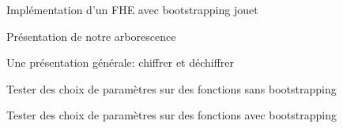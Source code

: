 \begin{section}{Implémentation d'un FHE avec bootstrapping \og{} jouet\fg{}}
	\begin{subsection}{Présentation de notre arborescence}
	\end{subsection}
	\begin{subsection}{Une présentation générale: chiffrer et déchiffrer}
	\end{subsection}
	\begin{subsection}{Tester des choix de paramètres sur des fonctions sans bootstrapping}
	\end{subsection}
	\begin{subsection}{Tester des choix de paramètres sur des fonctions avec bootstrapping}
	\end{subsection}
\end{section}
